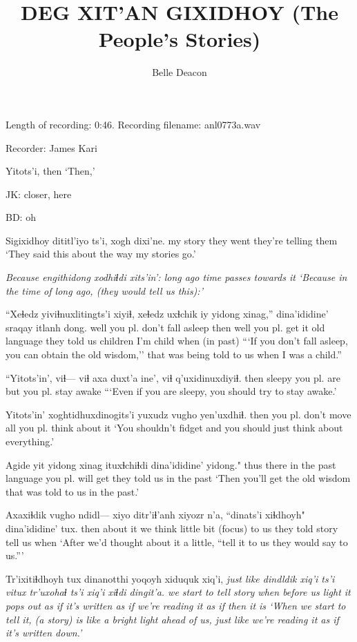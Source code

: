\documentclass[12pt]{article}
\begin{document}
\title{DEG XIT'AN GIXIDHOY \newline (The People's Stories)}

\author{Belle Deacon}

\maketitle

Length of recording:  0:46. Recording filename: anl0773a.wav

Recorder:  James Kari

\bigskip

\gll Yitots'i, 
then 
\glt  `Then,'
\glend

JK:  closer, here

BD:  oh

\gll Sigixidhoy dititl'iyo ts'i, {xogh dixi'ne.}
{my story} {they went} {} {they're telling them}
\glt `They said this about the way my stories go.'
\glend

\gll \em Because engithidong xodhiɬdi xits'in':
{long ago} {time passes} {towards it}
\glt `Because in the time of long ago, (they would tell us this):'
\glend

\gll ``Xeɬedz yiviɬnuxlitingts'i xiyiɬ, xeɬedz uxɬchik iy yidong xinag,'' dina'ididine' sraqay itlanh dong. 
well {you pl. don't fall asleep} then well {you pl. get} it old language {they told us} children {I'm child} {when (in past)}
\glt ```If you don't fall asleep, you can obtain the old wisdom,'' that was being told to us when I was a child.''
\glend

\gll ``Yitots'in', viɬ--- {viɬ axa} duxt'a ine', {viɬ q'uxidinuxdiyiɬ.} 
then {} sleepy {you pl. are} but {you pl. stay awake}
\glt ```Even if you are sleepy, you should try to stay awake.'
\glend

\gll Yitots'in' xoghtidhuxdinogits'i yuxudz {vugho yen'uxdhiɬ.} 
then {you pl. don't move} all {you pl. think about it}
\glt `You shouldn't fidget and you should just think about everything.'
\glend

\gll Agide yit yidong xinag ituxɬchiɬdi dina'ididine' yidong." 
thus there {in the past} language {you pl. will get} {they told us} {in the past}
\glt `Then you'll get the old wisdom that was told to us in the past.'
\glend

\gll Axaxiɬdik vugho ndidl--- {xiyo ditr'iɬ'anh} xiyozr n'a, ``dinats'i xiɬdhoyh" dina'ididine' tux. 
then {about it} {} {we think} {little bit} {(focus)} {to us} {they told story} {tell us} when
\glt `After we'd thought about it a little, ``tell it to us they would say to us.'''
\glend

\gll Tr'ixitiɬdhoyh tux dinanotthi yoqoyh xiduquk xiq'i, \em {just like} dindldik xiq'i ts'i {vitux tr'uxohaɬ} ts'i xiq'i xiɬdi dingit'a. 
{we start to tell story} when {before us} light {it pops out} {as if} {} {it's written} {as if} {} {we're reading it} {} {as if} then {it is}
\glt `When we start to tell it, (a story) is like a bright light ahead of us, just like we're reading it as if it's written down.'
\glend
\end{document}
